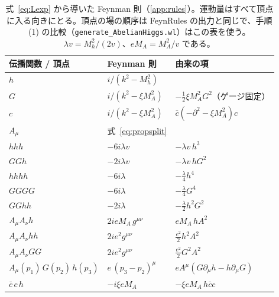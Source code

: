 \documentclass[a4paper,10pt]{ltjsarticle}
\begin{document}
\begin{table}[tbp]
\centering\small
\caption{式~\eqref{eq:Lexp} から導いた Feynman 則（\ref{app:rules}）。運動量はすべて頂点に入る向きにとる。頂点の場の順序は FeynRules の出力と同じで、手順 (1) の比較（\texttt{generate\_AbelianHiggs.wl}）はこの表を使う。$\lambda v=M_h^2/(2v)$、$eM_A=M_A^2/v$ である。}
\label{tab:rules}
\begin{tabular}{lll}
\toprule
伝播関数 / 頂点 & Feynman 則 & 由来の項 \\
\midrule
$h$ & $i/(k^2-M_h^2)$ & \\
$G$ & $i/(k^2-\xi M_A^2)$ & $-\frac12\xi M_A^2G^2$（ゲージ固定） \\
$c$ & $i/(k^2-\xi M_A^2)$ & $\bar c(-\partial^2-\xi M_A^2)c$ \\
$A_\mu$ & 式~\eqref{eq:propsplit} & \\
\midrule
$hhh$ & $-6i\lambda v$ & $-\lambda v\,h^3$ \\
$GGh$ & $-2i\lambda v$ & $-\lambda v\,hG^2$ \\
$hhhh$ & $-6i\lambda$ & $-\frac\lambda4h^4$ \\
$GGGG$ & $-6i\lambda$ & $-\frac\lambda4G^4$ \\
$GGhh$ & $-2i\lambda$ & $-\frac\lambda2h^2G^2$ \\
$A_\mu A_\nu h$ & $2ieM_A\,g^{\mu\nu}$ & $eM_A\,hA^2$ \\
$A_\mu A_\nu hh$ & $2ie^2g^{\mu\nu}$ & $\frac{e^2}2h^2A^2$ \\
$A_\mu A_\nu GG$ & $2ie^2g^{\mu\nu}$ & $\frac{e^2}2G^2A^2$ \\
$A_\mu(p_1)\,G(p_2)\,h(p_3)$ & $e\,(p_3-p_2)^\mu$ & $eA^\mu(G\partial_\mu h-h\partial_\mu G)$ \\
$\bar c\,c\,h$ & $-i\xi eM_A$ & $-\xi eM_A\,h\bar cc$ \\
\bottomrule
\end{tabular}
\end{table}
\end{document}
